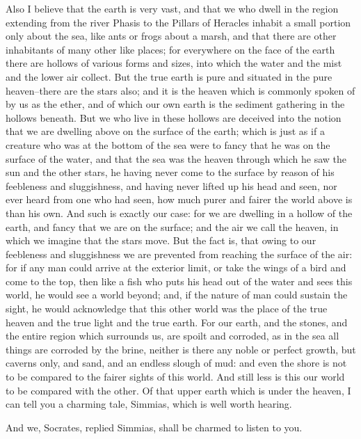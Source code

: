 Also I believe that the earth is very vast, and that we who dwell in
the region extending from the river Phasis to the Pillars of Heracles
inhabit a small portion only about the sea, like ants or frogs about a
marsh, and that there are other inhabitants of many other like places;
for everywhere on the face of the earth there are hollows of various
forms and sizes, into which the water and the mist and the lower
air collect. But the true earth is pure and situated in the pure
heaven--there are the stars also; and it is the heaven which is commonly
spoken of by us as the ether, and of which our own earth is the sediment
gathering in the hollows beneath. But we who live in these hollows are
deceived into the notion that we are dwelling above on the surface of
the earth; which is just as if a creature who was at the bottom of the
sea were to fancy that he was on the surface of the water, and that the
sea was the heaven through which he saw the sun and the other stars,
he having never come to the surface by reason of his feebleness and
sluggishness, and having never lifted up his head and seen, nor ever
heard from one who had seen, how much purer and fairer the world above
is than his own. And such is exactly our case: for we are dwelling in a
hollow of the earth, and fancy that we are on the surface; and the air
we call the heaven, in which we imagine that the stars move. But the
fact is, that owing to our feebleness and sluggishness we are prevented
from reaching the surface of the air: for if any man could arrive at the
exterior limit, or take the wings of a bird and come to the top, then
like a fish who puts his head out of the water and sees this world, he
would see a world beyond; and, if the nature of man could sustain the
sight, he would acknowledge that this other world was the place of the
true heaven and the true light and the true earth. For our earth, and
the stones, and the entire region which surrounds us, are spoilt and
corroded, as in the sea all things are corroded by the brine, neither
is there any noble or perfect growth, but caverns only, and sand, and an
endless slough of mud: and even the shore is not to be compared to the
fairer sights of this world. And still less is this our world to be
compared with the other. Of that upper earth which is under the heaven,
I can tell you a charming tale, Simmias, which is well worth hearing.

And we, Socrates, replied Simmias, shall be charmed to listen to you.

